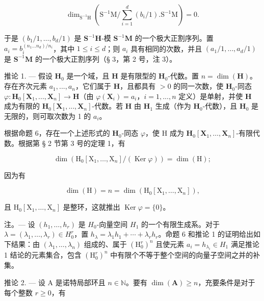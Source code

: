 \[
\dim_ {\mathrm{S} ^ {- 1} \mathrm{H}} (\mathrm{S} ^ {- 1} \mathrm{M} / \sum_ {i = 1} ^ {d} (b _ {i} / 1). \mathrm{S} ^ {- 1} \mathrm{M}) = 0.
\]

于是 \((b_{1} / 1,\dots,b_{d} / 1)\) 是 \(\mathbf{S}^{-1}\mathbf{H}\)-模 \(\mathbf{S}^{-1}\mathbf{M}\) 的一个极大正割序列。置 \(a_{i} = b_{i}^{(n_{1}\dots n_{d}) / n_{i}}\)，其中 \(1\leqslant i\leqslant d\)；则 \(a_{i}\) 具有相同的次数，并且 \((a_{1} / 1,\dots,a_{d} / 1)\) 是 \(\mathbf{S}^{-1}\mathbf{M}\) 的一个极大正割序列（§ 3，第 2 号，注 3）。

推论 1. --- 假设 \(\mathbf{H}_0\) 是一个域，且 \(\mathbf{H}\) 是有限型的 \(\mathbf{H}_0\)-代数。置 \(n = \dim(\mathbf{H})\)。存在齐次元素 \(a_1, ..., a_n\)，它们属于 \(\mathbf{H}\)，且都具有 \(>0\) 的同一次数，使 \(\mathbf{H}_0\)-同态 \(\varphi: \mathbf{H}_0[\mathbf{X}_1, ..., \mathbf{X}_n] \to \mathbf{H}\)（由 \(\varphi(\mathbf{X}_i) = a_i\)，\(i = 1, ..., n\) 定义）是单射，并使 \(\mathbf{H}\) 成为有限的 \(\mathbf{H}_0[\mathbf{X}_1, ..., \mathbf{X}_n]\)-代数。若 \(\mathbf{H}\) 由 \(\mathbf{H}_1\) 生成（作为 \(\mathbf{H}_0\)-代数），且 \(\mathbf{H}_0\) 是无限的，则可取次数为 1 的 \(a_i\)。

根据命题 6，存在一个上述形式的 \(\mathbf{H}_0\)-同态 \(\varphi\)，使 H 成为 \(\mathbf{H}_0[\mathbf{X}_1, \ldots, \mathbf{X}_n]\)-有限代数。根据第 § 2 节第 3 号的定理 1，有

\[
\dim \left(\mathrm{H} _ {0} \left[ \mathrm{X} _ {1}, \dots , \mathrm{X} _ {n} \right] / (\operatorname{Ker} \varphi)\right) = \dim (\mathrm{H});
\]

因为有

\[
\dim (\mathrm{H}) = n = \dim \left(\mathrm{H} _ {0} \left[ \mathrm{X} _ {1}, \dots , \mathrm{X} _ {n} \right]\right),
\]

且 \(\mathrm{H}_0[\mathrm{X}_1, \dots, \mathrm{X}_n]\) 是整环，这就推出 \(\operatorname{Ker} \varphi = \{0\}\)。

注。--- 设 \((h_{1}, \ldots, h_{r})\) 是 \(H_{0}\)-向量空间 \(H_{1}\) 的一个有限生成系。对于 \(\lambda = (\lambda_{1}, \ldots, \lambda_{r}) \in H_{0}^{r}\)，置 \(h_{\lambda} = \lambda_{1} h_{1} + \cdots + \lambda_{r} h_{r}\)。命题 6 和推论 1 的证明给出如下结果：由 \((\lambda_{1}, \ldots, \lambda_{n})\) 组成的、属于 \((\mathrm{H}_{0}^{r})^{n}\) 且使元素 \(a_{i} = h_{\lambda_{i}} \in H_{1}\) 满足推论 1 结论的元素集合，包含 \((\mathrm{H}_{0}^{r})^{n}\) 中有限个不等于整个空间的向量子空间之并的补集。

推论 2. --- 设 A 是诺特局部环且 \(n\in\mathbb{N}\)。要有 \(\dim(\mathbf{A})\geqslant n\)，充要条件是对于每个整数 \(r\geqslant0\)，有

